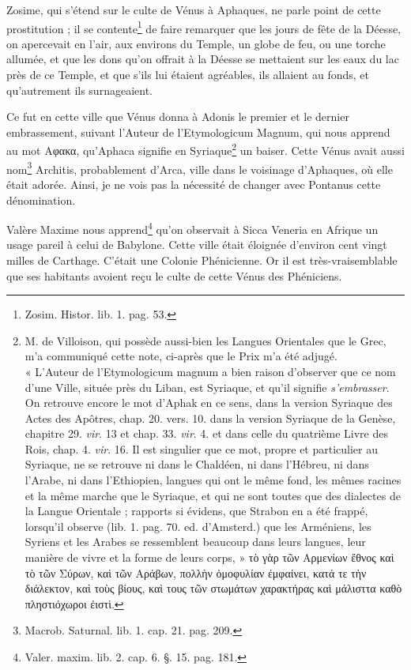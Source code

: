 \documentclass[a4paper, 18pt, oneside]{article}
\begin{document}
Zosime, qui s'étend sur le culte de Vénus à Aphaques, ne parle point de cette prostitution ; il se contente\footnote{Zosim. Histor. lib. 1. pag. 53.} de faire remarquer que les jours de fête de la Déesse, on apercevait en l'air, aux environs du Temple, un globe de feu, ou une torche allumée, et que les dons qu'on offrait à la Déesse se mettaient sur les eaux du lac près de ce Temple, et que s'ils lui étaient agréables, ils allaient au fonds, et qu'autrement ils surnageaient.

Ce fut en cette ville que Vénus donna à Adonis le premier et le dernier embrassement, suivant l'Auteur de l'Etymologicum Magnum, qui nous apprend au mot Αφακα, qu'Aphaca signifie en Syriaque\footnote{M. de Villoison, qui possède aussi-bien les Langues Orientales que le Grec, m'a communiqué cette note, ci-après que le Prix m'a été adjugé.\\\hspace*{5mm}« L'Auteur de l'Etymologicum magnum a bien raison d'observer que ce nom d'une Ville, située près du Liban, est Syriaque, et qu'il signifie \emph{s'embrasser}. On retrouve encore le mot d'Aphak en ce sens, dans la version Syriaque des Actes des Apôtres, chap. 20. vers. 10. dans la version Syriaque de la Genèse, chapitre 29. \emph{vir}. 13 et chap. 33. \emph{vir}. 4. et dans celle du quatrième Livre des Rois, chap. 4. \emph{vir}. 16. Il est singulier que ce mot, propre et particulier au Syriaque, ne se retrouve ni dans le Chaldéen, ni dans l'Hébreu, ni dans l'Arabe, ni dans l'Ethiopien, langues qui ont le même fond, les mêmes racines et la même marche que le Syriaque, et qui ne sont toutes que des dialectes de la Langue Orientale ; rapports si évidens, que Strabon en a été frappé, lorsqu'il observe (lib. 1. pag. 70. ed. d'Amsterd.) que les Arméniens, les Syriens et les Arabes se ressemblent beaucoup dans leurs langues, leur manière de vivre et la forme de leurs corps, » τὸ γὰρ τῶν Αρμενίων ἔθνος καὶ τὸ τῶν Σύρων, καὶ τῶν Αράβων, πολλὴν ὀμοφυλίαν ἐμφαίνει, κατά τε τὴν διάλεκτον, καὶ τοὺς βίους, καὶ τους τῶν στωμάτων χαρακτήρας καὶ μάλισττα καθὸ πληστιόχωροι ἐιστὶ.} un baiser. Cette Vénus avait aussi nom\footnote{Macrob. Saturnal. lib. 1. cap. 21. pag. 209.} Architis, probablement d'Arca, ville dans le voisinage d'Aphaques, où elle était adorée. Ainsi, je ne vois pas la nécessité de changer avec Pontanus cette dénomination.

Valère Maxime nous apprend\footnote{Valer. maxim. lib. 2. cap. 6. §. 15. pag. 181.} qu'on observait à Sicca Veneria en Afrique un usage pareil à celui de Babylone. Cette ville était éloignée d'environ cent vingt milles de Carthage. C'était une Colonie Phénicienne. Or il est très-vraisemblable que ses habitants avoient reçu le culte de cette Vénus des Phéniciens.
\end{document}
